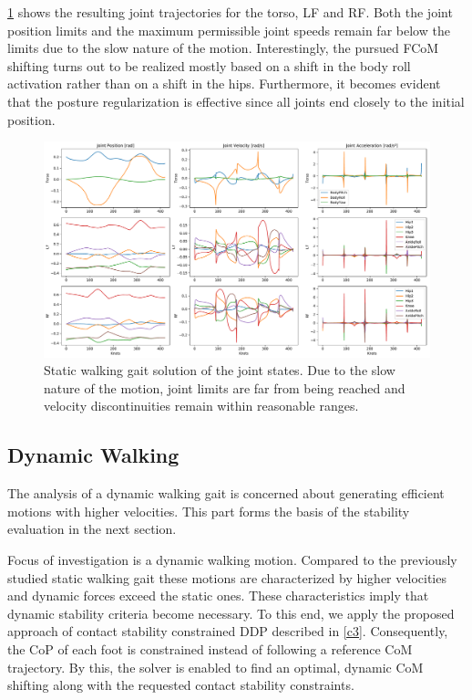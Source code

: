 \cref{fig:walkStatic_JointState} shows the resulting joint trajectories for the torso, \gls{LF} and \gls{RF}. Both the joint position limits and the maximum permissible joint speeds remain far below the limits due to the slow nature of the motion. Interestingly, the pursued \gls{FCoM} shifting turns out to be realized mostly based on a shift in the body roll activation rather than on a shift in the hips. Furthermore, it becomes evident that the posture regularization is effective since all joints end closely to the initial position.
\begin{figure}[h!]
\centering	
\includegraphics[width=1\textwidth]{fig/walkStatic/JointState}
\caption[Static walking gait solution of the joint states]{Static walking gait solution of the joint states. Due to the slow nature of the motion, joint limits are far from being reached and velocity discontinuities remain within reasonable ranges.}
\label{fig:walkStatic_JointState}
\end{figure} 

\subsection{Dynamic Walking}
The analysis of a dynamic walking gait is concerned about generating efficient motions with higher velocities. This part forms the basis of the stability evaluation in the next section.

Focus of investigation is a dynamic walking motion. Compared to the previously studied static walking gait these motions are characterized by higher velocities and dynamic forces exceed the static ones. These characteristics imply that dynamic stability criteria become necessary. To this end, we apply the proposed approach of contact stability constrained DDP described in \cref{c3}. Consequently, the \gls{CoP} of each foot is constrained instead of following a reference \gls{CoM} trajectory. By this, the solver is enabled to find an optimal, dynamic \gls{CoM} shifting along with the requested contact stability constraints. 

